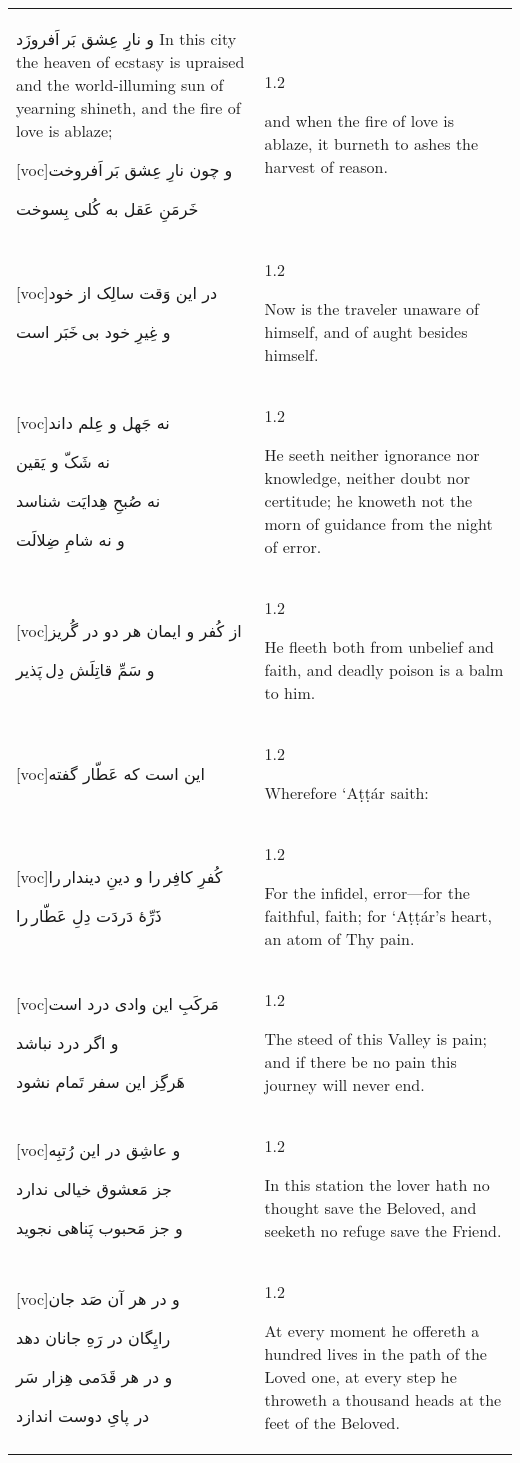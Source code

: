\documentclass[11pt]{article}
\makeatletter
\newenvironment{orig}
  {\begin{farsi}[voc]}
  {\end{farsi}}
\newenvironment{trans}
  {\large\begin{spacing}{1.2}\raggedright}
  {\end{spacing}}
\newenvironment{word}
  {\begin{longtable}[t]{p{3in}@{\hspace{3em}}p{2.5in}}}
  {\end{longtable}}
\newcommand{\ayat}[2]{
  \begin{orig}#1\end{orig} &
  \vspace{1.5ex}\begin{trans}#2\end{trans} \vspace{-2ex}\\
}
\makeatother
\begin{document}
\begin{word}
{و نارِ عِشق بَر اَفروزَد}
     {In this city the heaven of ecstasy is upraised and the world-illuming
      sun of yearning shineth, and the fire of love is ablaze;}

\ayat{و چون نارِ عِشق بَر اَفروخت

خَرمَنِ عَقل به کُلی بِسوخت}
     {and when the fire of love is ablaze, it burneth to ashes the harvest of
      reason.}

\ayat{در اين وَقت سالِک از خود

و غِيرِ خود بی خَبَر است}
     {Now is the traveler unaware of himself, and of aught besides himself.}

\ayat{نه جَهل و عِلم داند

نه شَکّ و يَقين

نه صُبحِ هِدايَت شناسد

و نه شامِ ضِلالَت}
     {He seeth neither ignorance nor knowledge, neither doubt nor certitude;
      he knoweth not the morn of guidance from the night of error.}

\ayat{از کُفر و ايمان هر دو در گُريز

و سَمِّ قاتِلَش دِل پَذير}
     {He fleeth both from unbelief and faith, and deadly poison is a balm to
      him.}

\ayat{اين است که عَطّار گفته}
     {Wherefore `Aṭṭár saith:}

\ayat{کُفرِ کافِر را و دينِ ديندار را

ذَرِّۀ دَردَت دِلِ عَطّار را}
     {For the infidel, error—for the faithful, faith; for `Aṭṭár’s heart, an
      atom of Thy pain.}

\ayat{مَرکَبِ اين وادی درد است

و اگر درد نباشد

هَرگِز اين سفر تَمام نشود}
     {The steed of this Valley is pain; and if there be no pain this journey
      will never end.}

\ayat{و عاشِق در اين رُتبِه

جز مَعشوق خيالی ندارد

و جز مَحبوب پَناهی نجويد}
     {In this station the lover hath no thought save the Beloved, and seeketh
      no refuge save the Friend.}

\ayat{و در هر آن صَد جان

رايِگان در رَهِ جانان دهد

و در هر قَدَمی هِزار سَر

در پایِ دوست اندازد}
     {At every moment he offereth a hundred lives in the path of the Loved
      one, at every step he throweth a thousand heads at the feet of the
      Beloved.}


\end{word}
\end{document}
